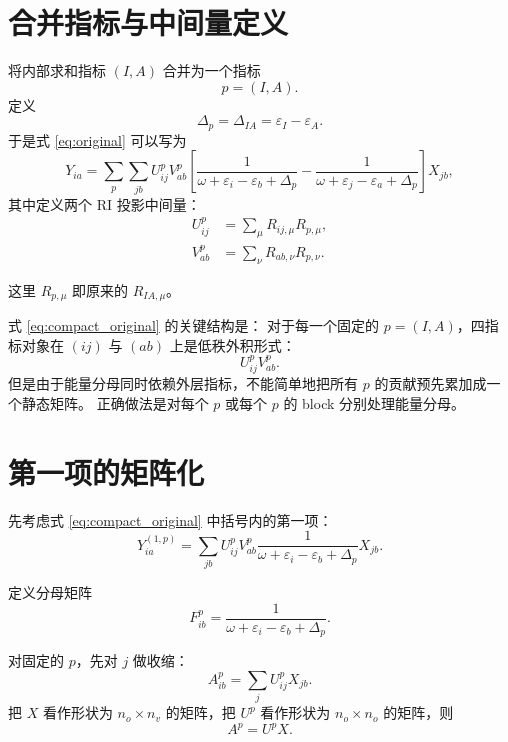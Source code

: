 \documentclass[UTF8,a4paper,11pt]{ctexart}
\newcommand{\eps}{\varepsilon}
\begin{document}
\section{合并指标与中间量定义}

将内部求和指标 $(I,A)$ 合并为一个指标
\begin{equation}
p=(I,A).
\end{equation}
定义
\begin{equation}
\Delta_p
=
\Delta_{IA}
=
\eps_I-\eps_A.
\end{equation}
于是式 \eqref{eq:original} 可以写为
\begin{equation}
Y_{ia}
=
\sum_{p}\sum_{jb}
U^p_{ij}
V^p_{ab}
\left[
\frac{1}{\omega+\eps_i-\eps_b+\Delta_p}
-
\frac{1}{\omega+\eps_j-\eps_a+\Delta_p}
\right]
X_{jb},
\label{eq:compact_original}
\end{equation}
其中定义两个 RI 投影中间量：
\begin{align}
U^p_{ij}
&=
\sum_{\mu} R_{ij,\mu}R_{p,\mu},
\label{eq:U_def}
\\
V^p_{ab}
&=
\sum_{\nu} R_{ab,\nu}R_{p,\nu}.
\label{eq:V_def}
\end{align}

这里 $R_{p,\mu}$ 即原来的 $R_{IA,\mu}$。

式 \eqref{eq:compact_original} 的关键结构是：
对于每一个固定的 $p=(I,A)$，四指标对象在 $(ij)$ 与 $(ab)$ 上是低秩外积形式：
\begin{equation}
U^p_{ij}V^p_{ab}.
\end{equation}
但是由于能量分母同时依赖外层指标，不能简单地把所有 $p$ 的贡献预先累加成一个静态矩阵。
正确做法是对每个 $p$ 或每个 $p$ 的 block 分别处理能量分母。

\section{第一项的矩阵化}

先考虑式 \eqref{eq:compact_original} 中括号内的第一项：
\begin{equation}
Y^{(1,p)}_{ia}
=
\sum_{jb}
U^p_{ij}V^p_{ab}
\frac{1}{\omega+\eps_i-\eps_b+\Delta_p}
X_{jb}.
\label{eq:first_term}
\end{equation}

定义分母矩阵
\begin{equation}
F^p_{ib}
=
\frac{1}{\omega+\eps_i-\eps_b+\Delta_p}.
\label{eq:F_def}
\end{equation}

对固定的 $p$，先对 $j$ 做收缩：
\begin{equation}
A^p_{ib}
=
\sum_j U^p_{ij}X_{jb}.
\label{eq:A_def}
\end{equation}
把 $X$ 看作形状为 $n_o\times n_v$ 的矩阵，把 $U^p$ 看作形状为 $n_o\times n_o$ 的矩阵，则
\begin{equation}
A^p = U^p X.
\label{eq:A_mat}
\end{equation}
\end{document}
